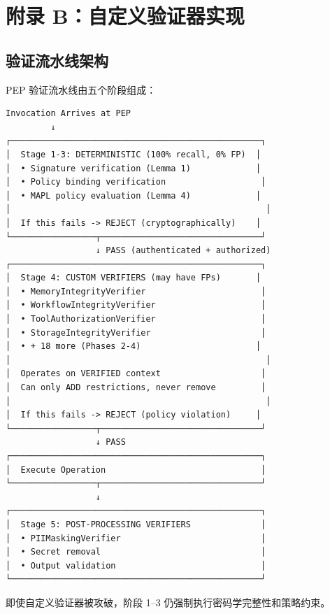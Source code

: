 \section*{附录 B：自定义验证器实现}
\label{appendix:verifiers}

\subsection*{验证流水线架构}

{\tiny
PEP 验证流水线由五个阶段组成：

\begin{verbatim}
Invocation Arrives at PEP
         ↓
┌──────────────────────────────────────────────────┐
│  Stage 1-3: DETERMINISTIC (100% recall, 0% FP)  │
│  • Signature verification (Lemma 1)             │
│  • Policy binding verification                   │
│  • MAPL policy evaluation (Lemma 4)             │
│                                                   │
│  If this fails -> REJECT (cryptographically)    │
└─────────────────┬────────────────────────────────┘
                  ↓ PASS (authenticated + authorized)
┌──────────────────────────────────────────────────┐
│  Stage 4: CUSTOM VERIFIERS (may have FPs)       │
│  • MemoryIntegrityVerifier                       │
│  • WorkflowIntegrityVerifier                     │
│  • ToolAuthorizationVerifier                     │
│  • StorageIntegrityVerifier                      │
│  • + 18 more (Phases 2-4)                       │
│                                                   │
│  Operates on VERIFIED context                    │
│  Can only ADD restrictions, never remove         │
│                                                   │
│  If this fails -> REJECT (policy violation)     │
└─────────────────┬────────────────────────────────┘
                  ↓ PASS
┌──────────────────────────────────────────────────┐
│  Execute Operation                               │
└─────────────────┬────────────────────────────────┘
                  ↓
┌──────────────────────────────────────────────────┐
│  Stage 5: POST-PROCESSING VERIFIERS              │
│  • PIIMaskingVerifier                            │
│  • Secret removal                                │
│  • Output validation                             │
└──────────────────────────────────────────────────┘
\end{verbatim}

即使自定义验证器被攻破，阶段 1--3 仍强制执行密码学完整性和策略约束。
}

